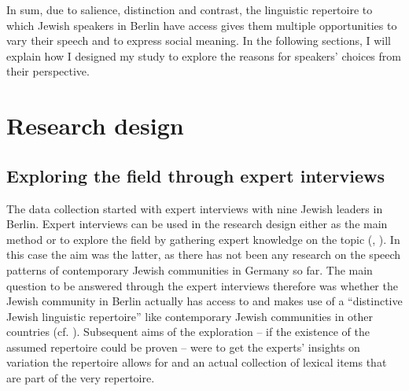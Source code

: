 \documentclass[output=paper]{langscibook}
\begin{document}
In sum, due to salience, distinction and contrast, the linguistic repertoire to which Jewish speakers in Berlin have access gives them multiple opportunities to vary their speech and to express social meaning. In the following sections, I will explain how I designed my study to explore the reasons for speakers’ choices from their perspective.

\section{Research design}
\subsection{Exploring the field through expert interviews}

\begin{sloppypar}
The data collection started with expert interviews with nine Jewish leaders in Berlin. Expert interviews can be used in the research design either as the main method or to explore the field by gathering expert knowledge on the topic (\citealt{MeuserNagel1991}, \citealt{BognerMenz2005}). In this case the aim was the latter, as there has not been any research on the speech patterns of contemporary Jewish communities in Germany so far. The main question to be answered through the expert interviews therefore was whether the Jewish community in Berlin actually has access to and makes use of a “distinctive Jewish linguistic repertoire” \citep[1064]{BuninBenor2008} like contemporary Jewish communities in other countries (cf. \citealt{HaryBuninBenor2018}). Subsequent aims of the exploration – if the existence of the assumed repertoire could be proven – were to get the experts’ insights on variation the repertoire allows for and an actual collection of lexical items that are part of the very repertoire.
\end{sloppypar}
\end{document}
